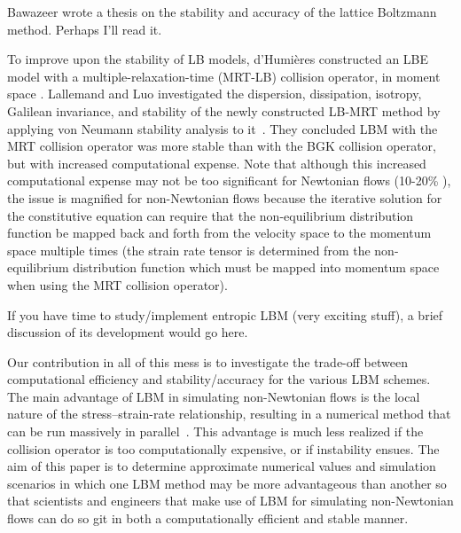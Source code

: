 \documentclass{article}
\begin{document}
{\color{red} Bawazeer wrote a thesis on the stability and accuracy of the lattice Boltzmann method. Perhaps I'll read it.}

To improve upon the stability of LB models, d'Humi\`{e}res constructed an LBE model with a multiple-relaxation-time (MRT-LB) collision operator, in moment space \cite{d1994generalized}. %
Lallemand and Luo investigated the dispersion, dissipation, isotropy, Galilean invariance, and stability of the newly constructed LB-MRT method by applying von Neumann stability analysis to it~\cite{lallemand2000theory}.
They concluded LBM with the MRT collision operator was more stable than with the BGK collision operator, but with increased computational expense. %
Note that although this increased computational expense may not be too significant for Newtonian flows (10-20\% \cite{lallemand2000theory}), the issue is magnified for non-Newtonian flows because the iterative solution for the constitutive equation can require that the non-equilibrium distribution function be mapped back and forth from the velocity space to the momentum space multiple times (the strain rate tensor is determined from the non-equilibrium distribution function which must be mapped into momentum space when using the MRT collision operator). %

{\color{red} If you have time to study/implement entropic LBM (very exciting stuff), a brief discussion of its development would go here.}

Our contribution in all of this mess is to investigate the trade-off between computational efficiency and stability/accuracy for the various LBM schemes.
The main advantage of LBM in simulating non-Newtonian flows is the local nature of the stress--strain-rate relationship, resulting in a numerical method that can be run massively in parallel~\cite{something}.
This advantage is much less realized if the collision operator is too computationally expensive, or if instability ensues.
The aim of this paper is to determine approximate numerical values and simulation scenarios in which one LBM method may be more advantageous than another so that scientists and engineers that make use of LBM for simulating non-Newtonian flows can do so git in both a computationally efficient and stable manner. %
\end{document}
